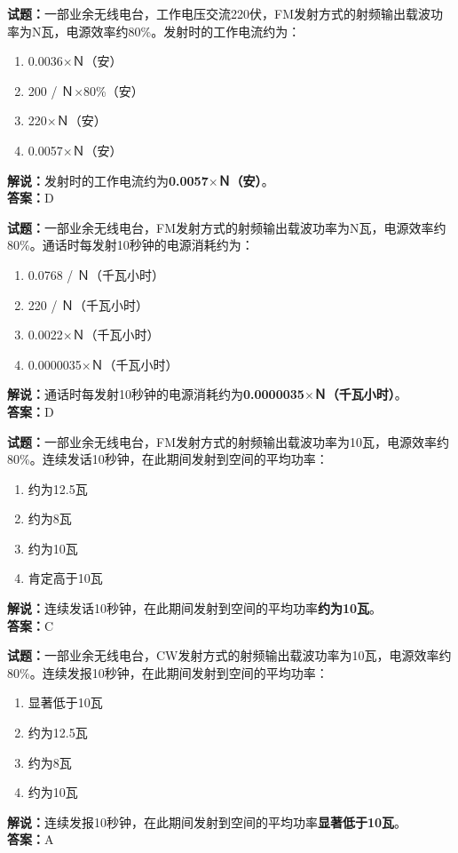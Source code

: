 \documentclass{ctexbook}
\begin{document}
\vspace{1em}

\textbf{试题：}一部业余无线电台，工作电压交流220伏，FM发射方式的射频输出载波功率为N瓦，电源效率约80\%。发射时的工作电流约为：
\begin{enumerate}[leftmargin=3em]
  \item 0.0036$\times$Ｎ（安）
  \item 200 / Ｎ$\times$80\%（安）%
  \item 220$\times$Ｎ（安）
  \item 0.0057$\times$Ｎ（安）
\end{enumerate}
\noindent\textbf{解说：}发射时的工作电流约为\textbf{0.0057$\times$Ｎ（安）}。\\\noindent\textbf{答案：}D

\vspace{1em}

\textbf{试题：}一部业余无线电台，FM发射方式的射频输出载波功率为N瓦，电源效率约80\%。通话时每发射10秒钟的电源消耗约为：
\begin{enumerate}[leftmargin=3em]
  \item 0.0768 / Ｎ（千瓦小时）%
  \item 220 / Ｎ（千瓦小时）
  \item 0.0022$\times$Ｎ（千瓦小时）
  \item 0.0000035$\times$Ｎ（千瓦小时）
\end{enumerate}
\noindent\textbf{解说：}通话时每发射10秒钟的电源消耗约为\textbf{0.0000035$\times$Ｎ（千瓦小时）}。\\\noindent\textbf{答案：}D

\vspace{1em}

\textbf{试题：}一部业余无线电台，FM发射方式的射频输出载波功率为10瓦，电源效率约80\%。连续发话10秒钟，在此期间发射到空间的平均功率：
\begin{enumerate}[leftmargin=3em]
  \item 约为12.5瓦
  \item 约为8瓦
  \item 约为10瓦
  \item 肯定高于10瓦
\end{enumerate}
\noindent\textbf{解说：}连续发话10秒钟，在此期间发射到空间的平均功率\textbf{约为10瓦}。\\\noindent\textbf{答案：}C

\vspace{1em}

\textbf{试题：}一部业余无线电台，CW发射方式的射频输出载波功率为10瓦，电源效率约80\%。连续发报10秒钟，在此期间发射到空间的平均功率：
\begin{enumerate}[leftmargin=3em]
  \item 显著低于10瓦
  \item 约为12.5瓦
  \item 约为8瓦
  \item 约为10瓦
\end{enumerate}
\noindent\textbf{解说：}连续发报10秒钟，在此期间发射到空间的平均功率\textbf{显著低于10瓦}。\\\noindent\textbf{答案：}A
\end{document}

